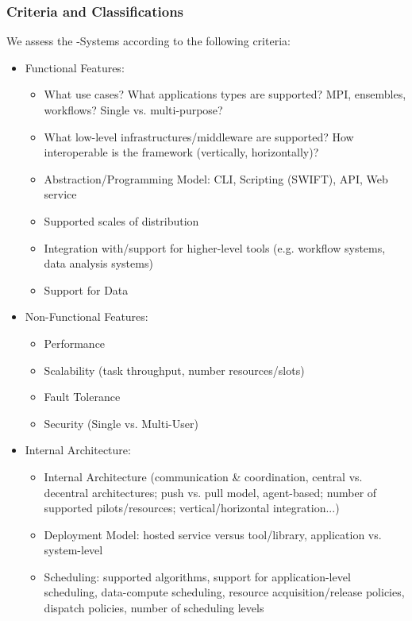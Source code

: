 \documentclass{sig-alternate}
\begin{document}
\subsubsection*{Criteria and Classifications}
We assess the \pilotjob-Systems according to the following criteria:
\begin{itemize}
	\item Functional Features:
	\begin{itemize}
		\item What use cases? What applications types are supported? MPI, 
		ensembles, workflows? Single vs. multi-purpose?
		\item What low-level infrastructures/middleware are supported? How 
		interoperable is the framework (vertically, horizontally)?
		\item Abstraction/Programming Model: CLI, Scripting (SWIFT), API, Web 
		service
		\item Supported scales of distribution
		\item Integration with/support for higher-level tools (e.g. workflow 
		systems, data analysis systems)		
		\item Support for Data
	\end{itemize}
	\item Non-Functional Features:
	\begin{itemize}
		\item Performance 
		\item Scalability (task throughput, number resources/slots)
		\item Fault Tolerance
		\item Security (Single vs. Multi-User)
	\end{itemize}
    \item Internal Architecture:
	\begin{itemize}
		\item Internal Architecture (communication \& coordination, central 
		vs. decentral architectures; push vs. pull model, agent-based; number 
		of supported pilots/resources; vertical/horizontal integration...)
		\item Deployment Model: hosted service versus tool/library, 
		application vs. system-level
		\item Scheduling: supported algorithms, support for application-level 
		scheduling, data-compute scheduling, resource acquisition/release 
		policies, dispatch policies, number of scheduling levels		
	\end{itemize}		
\end{itemize}
\end{document}
